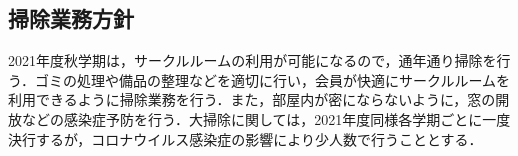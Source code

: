 \subsection*{掃除業務方針}


2021年度秋学期は，サークルルームの利用が可能になるので，通年通り掃除を行う．ゴミの処理や備品の整理などを適切に行い，会員が快適にサークルルームを利用できるように掃除業務を行う．また，部屋内が密にならないように，窓の開放などの感染症予防を行う．大掃除に関しては，2021年度同様各学期ごとに一度決行するが，コロナウイルス感染症の影響により少人数で行うこととする．
